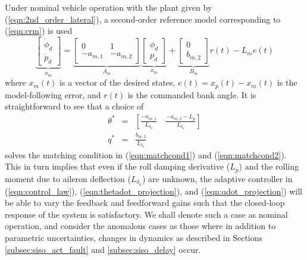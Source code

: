 Under nominal vehicle operation with the plant given by (\ref{eqn:2nd_order_lateral}), a second-order reference model corresponding to (\ref{eqn:crm}) is used
\begin{equation}
	\underbrace{\begin{bmatrix}
		\dot{\phi}_d \\ \dot{p}_d
	\end{bmatrix}}_{\dot{x}_m} = \underbrace{\begin{bmatrix}
		0 & 1\\ -a_{m,1} & -a_{m,2}
	\end{bmatrix}}_{A_m} \underbrace{\begin{bmatrix}
		\phi_d \\ p_d
	\end{bmatrix}}_{x_m} + \underbrace{\begin{bmatrix}
		0 \\ b_{m,2}
	\end{bmatrix}}_{B_m} r(t) - L_m e(t)
	\label{eqn:rm_2_symbolic}
\end{equation}
\noindent where $x_m(t)$ is a vector of the desired states, $e(t) = x_p(t) - x_m(t)$ is the model-following error, and $r(t)$ is the commanded bank angle. It is straightforward to see that a choice of
\begin{eqnarray}
	\theta^* &=& \left[ \frac{-a_{m,1}}{L_{\delta_a}} \quad \frac{-a_{m,2}-L_p}{L_{\delta_a}} \right] \label{e:tstar}\\
	q^* &=& \frac{b_{m,2}}{L_{\delta_a}} \label{e:qstar}
\end{eqnarray} 
\noindent solves the matching condition in (\ref{eqn:matchcond1}) and (\ref{eqn:matchcond2}). This in turn implies that even if the roll damping derivative ($L_p$) and the rolling moment due to aileron deflection ($L_{\delta_a}$) are unknown, the adaptive controller in (\ref{eqn:control_law}), (\ref{eqn:thetadot_projection}), and (\ref{eqn:qdot_projection}) will be able to vary the feedback and feedforward gains such that the closed-loop response of the system is satisfactory. We shall denote such a case as nominal operation, and consider the anomalous cases as those where in addition to parametric uncertainties, changes in dynamics as described in Sections \ref{subsec:siso_act_fault} and \ref{subsec:siso_delay} occur.

